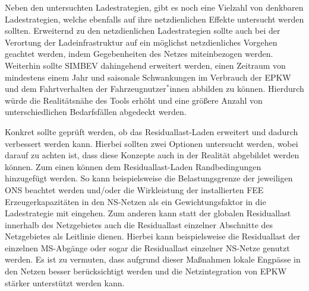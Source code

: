 Neben den untersuchten Ladestrategien, gibt es noch eine Vielzahl von denkbaren Ladestrategien, welche ebenfalls auf ihre netzdienlichen Effekte untersucht werden sollten.
Erweiternd zu den netzdienlichen Ladestrategien sollte auch bei der Verortung der Ladeinfrastruktur auf ein möglichst netzdienliches Vorgehen geachtet werden, indem Gegebenheiten des Netzes miteinbezogen werden.
Weiterhin sollte \gls{SIMBEV} dahingehend erweitert werden, einen Zeitraum von mindestens einem Jahr und saisonale Schwankungen im Verbrauch der \gls{EPKW} und dem Fahrtverhalten der Fahrzeugnutzer\(^*\)innen abbilden zu können.
Hierdurch würde die Realitätsnähe des Tools erhöht und eine größere Anzahl von unterschiedlichen Bedarfsfällen abgedeckt werden.\medskip

Konkret sollte geprüft werden, ob das Residuallast-Laden erweitert und dadurch verbessert werden kann.
Hierbei sollten zwei Optionen untersucht werden, wobei darauf zu achten ist, dass diese Konzepte auch in der Realität abgebildet werden können.
Zum einen können dem Residuallast-Laden Randbedingungen hinzugefügt werden.
So kann beispielsweise die Belastungsgrenze der jeweiligen \gls{ONS} beachtet werden und/oder die Wirkleistung der installierten \gls{FEE} Erzeugerkapazitäten in den \gls{NS}-Netzen als ein Gewichtungsfaktor in die Ladestrategie mit eingehen.
Zum anderen kann statt der globalen Residuallast innerhalb des Netzgebietes auch die Residuallast einzelner Abschnitte des Netzgebietes als Leitlinie dienen.
Hierbei kann beispielsweise die Residuallast der einzelnen \gls{MS}-Abgänge oder sogar die Residuallast einzelner \gls{NS}-Netze genutzt werden.
Es ist zu vermuten, dass aufgrund dieser Maßnahmen lokale Engpässe in den Netzen besser berücksichtigt werden und die Netzintegration von \gls{EPKW} stärker unterstützt werden kann.

